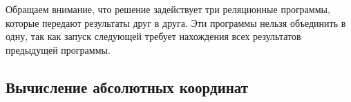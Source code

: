 
Обращаем внимание, что решение задействует три реляционные программы, которые передают результаты друг в друга. Эти программы нельзя объединить в одну, так как запуск следующей требует нахождения всех результатов предыдущей программы.


\subsection{Вычисление абсолютных координат}

